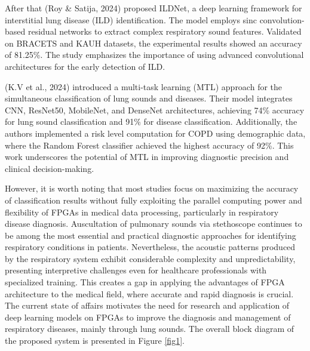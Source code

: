 After that (Roy \& Satija, 2024) \cite{b14} proposed ILDNet, a deep learning framework for interstitial lung disease (ILD) identification. The model employs sinc convolution-based residual networks to extract complex respiratory sound features. Validated on BRACETS and KAUH datasets, the experimental results showed an accuracy of 81.25\%. The study emphasizes the importance of using advanced convolutional architectures for the early detection of ILD.



(K.V et al., 2024) \cite{b15} introduced a multi-task learning (MTL) approach for the simultaneous classification of lung sounds and diseases. Their model integrates CNN, ResNet50, MobileNet, and DenseNet architectures, achieving 74\% accuracy for lung sound classification and 91\% for disease classification. Additionally, the authors implemented a risk level computation for COPD using demographic data, where the Random Forest classifier achieved the highest accuracy of 92\%. This work underscores the potential of MTL in improving diagnostic precision and clinical decision-making.

However, it is worth noting that most studies focus on maximizing the accuracy of classification results without fully exploiting the parallel computing power and flexibility of FPGAs in medical data processing, particularly in respiratory disease diagnosis. 
Auscultation of pulmonary sounds via stethoscope continues to be among the most essential and practical diagnostic approaches for identifying respiratory conditions in patients. Nevertheless, the acoustic patterns produced by the respiratory system exhibit considerable complexity and unpredictability, presenting interpretive challenges even for healthcare professionals with specialized training.
This creates a gap in applying the advantages of FPGA architecture to the medical field, where accurate and rapid diagnosis is crucial. The current state of affairs motivates the need for research and application of deep learning models on FPGAs to improve the diagnosis and management of respiratory diseases, mainly through lung sounds. The overall block diagram of the proposed system is presented in Figure \ref{fig1}.
